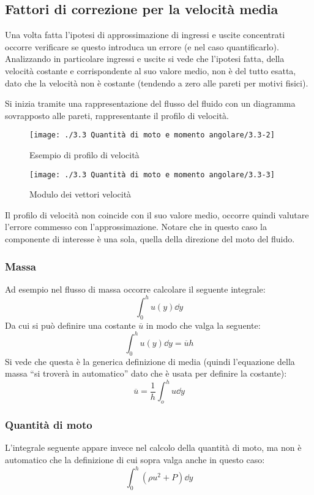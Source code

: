 \subsection{Fattori di correzione per la velocità media}
Una volta fatta l'ipotesi di approssimazione di ingressi e uscite concentrati occorre verificare se questo introduca un errore (e nel caso quantificarlo).
Analizzando in particolare ingressi e uscite si vede che l'ipotesi fatta, della velocità costante e corrispondente al suo valore medio, non è del tutto esatta, dato che la velocità non è costante (tendendo a zero alle pareti per motivi fisici).

Si inizia tramite una rappresentazione del flusso del fluido con un diagramma sovrapposto alle pareti, rappresentante il profilo di velocità.
%
	\begin{figure}[ht]
		\texttt{[image: ./3.3 Quantità di moto e momento angolare/3.3-2]}
		\centering
		\caption{Esempio di profilo di velocità}
	\end{figure}
%
	\begin{figure}[ht]
		\texttt{[image: ./3.3 Quantità di moto e momento angolare/3.3-3]}
		\centering
		\caption{Modulo dei vettori velocità}
	\end{figure}
%
Il profilo di velocità non coincide con il suo valore medio, occorre quindi valutare l'errore commesso con l'approssimazione.
Notare che in questo caso la componente di interesse è una sola, quella della direzione del moto del fluido.

\subsubsection{Massa}
Ad esempio nel flusso di massa occorre calcolare il seguente integrale:
%
	\begin{equation*}
		\int_0^h u(y) \dd{y}
	\end{equation*}
%
Da cui si può definire una costante $\overline{u}$ in modo che valga la seguente:
%
	\begin{equation*}
		\int_0^h u(y) \dd{y} = \overline{u} h
	\end{equation*}
Si vede che questa è la generica definizione di media (quindi l'equazione della massa ``si troverà in automatico'' dato che è usata per definire la costante):
%
	\begin{equation*}
		\overline{u} = \frac{1}{h} \int_o^h u \dd{y} 
	\end{equation*} 
%
	
\subsubsection{Quantità di moto}	
L'integrale seguente appare invece nel calcolo della quantità di moto, ma non è automatico che la definizione di cui sopra valga anche in questo caso:
%
	\begin{equation*}
		\int_0^h (\rho u^2 + P) \dd{y} 
	\end{equation*}
%

